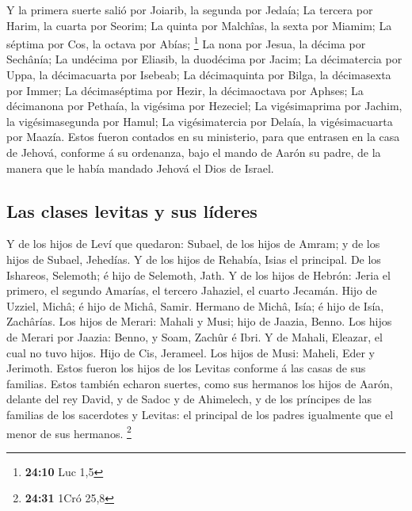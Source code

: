  Y la primera suerte salió por Joiarib, la segunda por
Jedaía;  La tercera por Harim, la cuarta por Seorim;
 La quinta por Malchîas, la sexta por Miamim; 
La séptima por Cos, la octava por Abías; \footnote{\textbf{24:10} Luc
  1,5}  La nona por Jesua, la décima por Sechânía;
 La undécima por Eliasib, la duodécima por Jacim;
 La décimatercia por Uppa, la décimacuarta por Isebeab;
 La décimaquinta por Bilga, la décimasexta por Immer;
 La décimaséptima por Hezir, la décimaoctava por Aphses;
 La décimanona por Pethaía, la vigésima por Hezeciel;
 La vigésimaprima por Jachim, la vigésimasegunda por Hamul;
 La vigésimatercia por Delaía, la vigésimacuarta por
Maazía.  Estos fueron contados en su ministerio, para que
entrasen en la casa de Jehová, conforme á su ordenanza, bajo el mando de
Aarón su padre, de la manera que le había mandado Jehová el Dios de
Israel.

\hypertarget{las-clases-levitas-y-sus-luxedderes}{%
\subsection{Las clases levitas y sus
líderes}\label{las-clases-levitas-y-sus-luxedderes}}

 Y de los hijos de Leví que quedaron: Subael, de los hijos
de Amram; y de los hijos de Subael, Jehedías.  Y de los
hijos de Rehabía, Isias el principal.  De los Ishareos,
Selemoth; é hijo de Selemoth, Jath.  Y de los hijos de
Hebrón: Jeria el primero, el segundo Amarías, el tercero Jahaziel, el
cuarto Jecamán.  Hijo de Uzziel, Michâ; é hijo de Michâ,
Samir.  Hermano de Michâ, Isía; é hijo de Isía, Zachârías.
 Los hijos de Merari: Mahali y Musi; hijo de Jaazia, Benno.
 Los hijos de Merari por Jaazia: Benno, y Soam, Zachûr é
Ibri.  Y de Mahali, Eleazar, el cual no tuvo hijos.
 Hijo de Cis, Jerameel.  Los hijos de Musi:
Maheli, Eder y Jerimoth. Estos fueron los hijos de los Levitas conforme
á las casas de sus familias.  Estos también echaron
suertes, como sus hermanos los hijos de Aarón, delante del rey David, y
de Sadoc y de Ahimelech, y de los príncipes de las familias de los
sacerdotes y Levitas: el principal de los padres igualmente que el menor
de sus hermanos. \footnote{\textbf{24:31} 1Cró 25,8}

